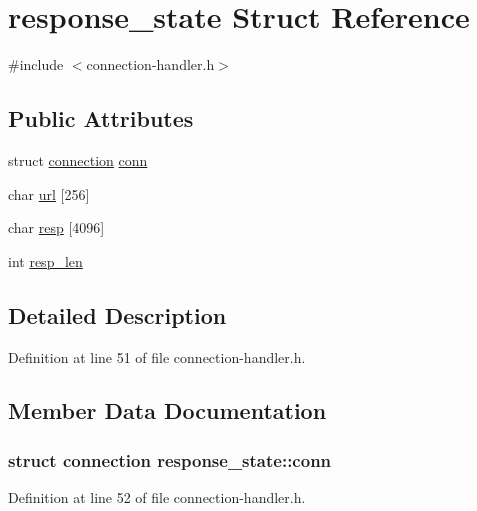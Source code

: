 \hypertarget{structresponse__state}{\section{response\-\_\-state Struct Reference}
\label{structresponse__state}
}


{\ttfamily \#include $<$connection-\/handler.\-h$>$}

\subsection*{Public Attributes}
\begin{DoxyCompactItemize}
\item 
struct \hyperlink{structconnection}{connection} \hyperlink{structresponse__state_ac1ab399c44d920b03094a1f86b999cf2}{conn}
\item 
char \hyperlink{structresponse__state_a8f1c401abbed7387d7e60181d0cb2791}{url} \mbox{[}256\mbox{]}
\item 
char \hyperlink{structresponse__state_afb106346ba6cd2fbbd890c8ec9540876}{resp} \mbox{[}4096\mbox{]}
\item 
int \hyperlink{structresponse__state_ae88a2831ab15e9936f7eff929ee907c4}{resp\-\_\-len}
\end{DoxyCompactItemize}


\subsection{Detailed Description}


Definition at line 51 of file connection-\/handler.\-h.



\subsection{Member Data Documentation}
\hypertarget{structresponse__state_ac1ab399c44d920b03094a1f86b999cf2}{
\subsubsection[{conn}]{\setlength{\rightskip}{0pt plus 5cm}struct {\bf connection} response\-\_\-state\-::conn}}\label{structresponse__state_ac1ab399c44d920b03094a1f86b999cf2}


Definition at line 52 of file connection-\/handler.\-h.


